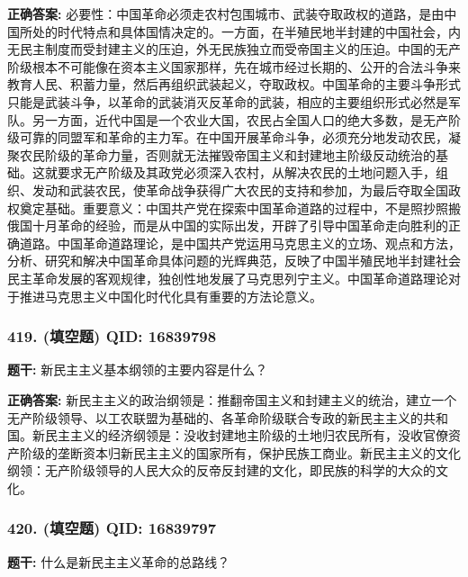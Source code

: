 \documentclass[12pt,UTF8]{ctexart}
\begin{document}
\textbf{正确答案:}
必要性：中国革命必须走农村包围城市、武装夺取政权的道路，是由中国所处的时代特点和具体国情决定的。一方面，在半殖民地半封建的中国社会，内无民主制度而受封建主义的压迫，外无民族独立而受帝国主义的压迫。中国的无产阶级根本不可能像在资本主义国家那样，先在城市经过长期的、公开的合法斗争来教育人民、积蓄力量，然后再组织武装起义，夺取政权。中国革命的主要斗争形式只能是武装斗争，以革命的武装消灭反革命的武装，相应的主要组织形式必然是军队。另一方面，近代中国是一个农业大国，农民占全国人口的绝大多数，是无产阶级可靠的同盟军和革命的主力军。在中国开展革命斗争，必须充分地发动农民，凝聚农民阶级的革命力量，否则就无法摧毁帝国主义和封建地主阶级反动统治的基础。这就要求无产阶级及其政党必须深入农村，从解决农民的土地问题入手，组织、发动和武装农民，使革命战争获得广大农民的支持和参加，为最后夺取全国政权奠定基础。重要意义：中国共产党在探索中国革命道路的过程中，不是照抄照搬俄国十月革命的经验，而是从中国的实际出发，开辟了引导中国革命走向胜利的正确道路。中国革命道路理论，是中国共产党运用马克思主义的立场、观点和方法，分析、研究和解决中国革命具体问题的光辉典范，反映了中国半殖民地半封建社会民主革命发展的客观规律，独创性地发展了马克思列宁主义。中国革命道路理论对于推进马克思主义中国化时代化具有重要的方法论意义。

\vspace{0.3em}\hrulefill\vspace{0.7em}

\subsubsection*{419. (填空题) \small QID: 16839798}

\textbf{题干:}
新民主主义基本纲领的主要内容是什么？

\textbf{正确答案:}
新民主主义的政治纲领是：推翻帝国主义和封建主义的统治，建立一个无产阶级领导、以工农联盟为基础的、各革命阶级联合专政的新民主主义的共和国。新民主主义的经济纲领是：没收封建地主阶级的土地归农民所有，没收官僚资产阶级的垄断资本归新民主主义的国家所有，保护民族工商业。新民主主义的文化纲领：无产阶级领导的人民大众的反帝反封建的文化，即民族的科学的大众的文化。

\vspace{0.3em}\hrulefill\vspace{0.7em}

\subsubsection*{420. (填空题) \small QID: 16839797}

\textbf{题干:}
什么是新民主主义革命的总路线？
\end{document}
